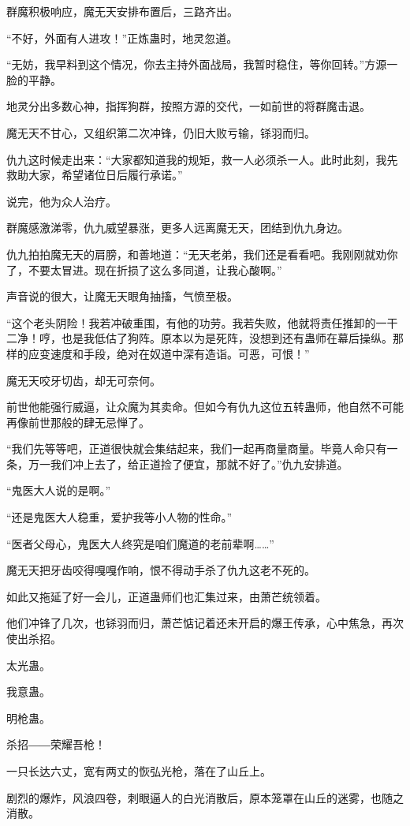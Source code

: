 \begin{this_body}
群魔积极响应，魔无天安排布置后，三路齐出。

“不好，外面有人进攻！”正炼蛊时，地灵忽道。

“无妨，我早料到这个情况，你去主持外面战局，我暂时稳住，等你回转。”方源一脸的平静。

地灵分出多数心神，指挥狗群，按照方源的交代，一如前世的将群魔击退。

魔无天不甘心，又组织第二次冲锋，仍旧大败亏输，铩羽而归。

仇九这时候走出来：“大家都知道我的规矩，救一人必须杀一人。此时此刻，我先救助大家，希望诸位日后履行承诺。”

说完，他为众人治疗。

群魔感激涕零，仇九威望暴涨，更多人远离魔无天，团结到仇九身边。

仇九拍拍魔无天的肩膀，和善地道：“无天老弟，我们还是看看吧。我刚刚就劝你了，不要太冒进。现在折损了这么多同道，让我心酸啊。”

声音说的很大，让魔无天眼角抽搐，气愤至极。

“这个老头阴险！我若冲破重围，有他的功劳。我若失败，他就将责任推卸的一干二净！哼，也是我低估了狗阵。原本以为是死阵，没想到还有蛊师在幕后操纵。那样的应变速度和手段，绝对在奴道中深有造诣。可恶，可恨！”

魔无天咬牙切齿，却无可奈何。

前世他能强行威逼，让众魔为其卖命。但如今有仇九这位五转蛊师，他自然不可能再像前世那般的肆无忌惮了。

“我们先等等吧，正道很快就会集结起来，我们一起再商量商量。毕竟人命只有一条，万一我们冲上去了，给正道捡了便宜，那就不好了。”仇九安排道。

“鬼医大人说的是啊。”

“还是鬼医大人稳重，爱护我等小人物的性命。”

“医者父母心，鬼医大人终究是咱们魔道的老前辈啊……”

魔无天把牙齿咬得嘎嘎作响，恨不得动手杀了仇九这老不死的。

如此又拖延了好一会儿，正道蛊师们也汇集过来，由萧芒统领着。

他们冲锋了几次，也铩羽而归，萧芒惦记着还未开启的爆王传承，心中焦急，再次使出杀招。

太光蛊。

我意蛊。

明枪蛊。

杀招――荣耀吾枪！

一只长达六丈，宽有两丈的恢弘光枪，落在了山丘上。

剧烈的爆炸，风浪四卷，刺眼逼人的白光消散后，原本笼罩在山丘的迷雾，也随之消散。


\end{this_body}
